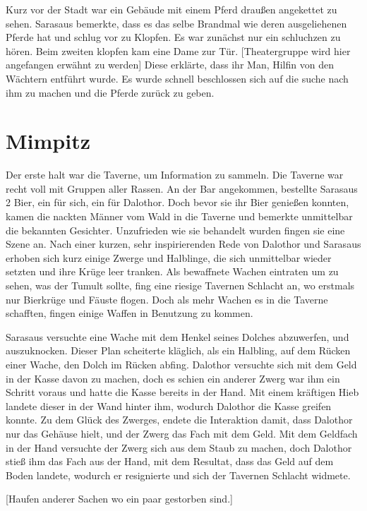 \documentclass[10pt,twoside,twocolumn,openany]{book}
\begin{document}
	Kurz vor der Stadt war ein Gebäude mit einem Pferd draußen angekettet zu sehen. Sarasaus bemerkte, dass es das selbe Brandmal wie deren ausgeliehenen Pferde hat und schlug vor zu Klopfen. Es war zunächst nur ein schluchzen zu hören. Beim zweiten klopfen kam eine Dame zur Tür. [Theatergruppe wird hier angefangen erwähnt zu werden] Diese erklärte, dass ihr Man, Hilfin von den Wächtern entführt wurde. Es wurde schnell beschlossen sich auf die suche nach ihm zu machen und die Pferde zurück zu geben. 
	
	\section{Mimpitz}
	Der erste halt war die Taverne, um Information zu sammeln. Die Taverne war recht voll mit Gruppen aller Rassen. An der Bar angekommen, bestellte Sarasaus 2 Bier, ein für sich, ein für Dalothor. Doch bevor sie ihr Bier genießen konnten, kamen die nackten Männer vom Wald in die Taverne und bemerkte unmittelbar die bekannten Gesichter. Unzufrieden wie sie behandelt wurden fingen sie eine Szene an. Nach einer kurzen, sehr inspirierenden Rede von Dalothor und Sarasaus erhoben sich kurz einige Zwerge und Halblinge, die sich unmittelbar wieder setzten und ihre Krüge leer tranken. Als bewaffnete Wachen eintraten um zu sehen, was der Tumult sollte, fing eine riesige Tavernen Schlacht an, wo erstmals nur Bierkrüge und Fäuste flogen. Doch als mehr Wachen es in die Taverne schafften, fingen einige Waffen in Benutzung zu kommen. 
	
	Sarasaus versuchte eine Wache mit dem Henkel seines Dolches abzuwerfen, und auszuknocken. Dieser Plan scheiterte kläglich, als ein Halbling, auf dem Rücken einer Wache, den Dolch im Rücken abfing. Dalothor versuchte sich mit dem Geld in der Kasse davon zu machen, doch es schien ein anderer Zwerg war ihm ein Schritt voraus und hatte die Kasse bereits in der Hand. Mit einem kräftigen Hieb landete dieser in der Wand hinter ihm, wodurch Dalothor die Kasse greifen konnte. Zu dem Glück des Zwerges, endete die Interaktion damit, dass Dalothor nur das Gehäuse  hielt, und der Zwerg das Fach mit dem Geld. Mit dem Geldfach in der Hand versuchte der Zwerg sich aus dem Staub zu machen, doch Dalothor stieß ihm das Fach aus der Hand, mit dem Resultat,  dass das Geld auf dem Boden landete, wodurch er resignierte und sich der Tavernen Schlacht widmete. 
	
	[Haufen anderer Sachen wo ein paar gestorben sind.]
	
\end{document}
